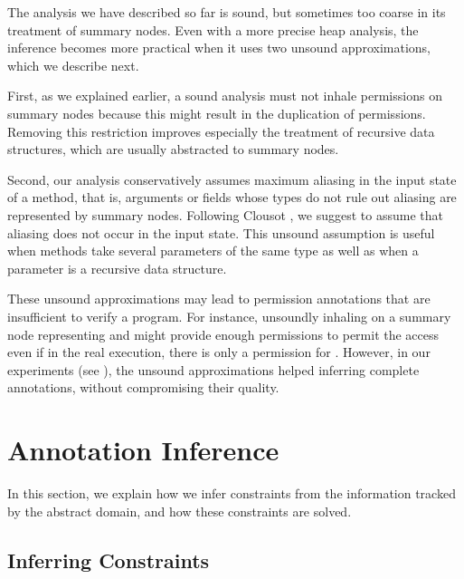 \documentclass{llncs}
\begin{document}
The analysis we have described so far is sound, but sometimes too
coarse in its treatment of summary nodes. Even with a more precise
heap analysis, the inference  becomes more practical when it uses
two unsound approximations, which we describe next.

First, as we explained earlier, a sound analysis must not inhale
permissions on summary nodes because this might result in the
duplication of permissions. Removing this restriction improves
especially the treatment of recursive data structures, which 
are usually abstracted to summary nodes.

Second, our analysis conservatively assumes maximum aliasing in the
input state of a method, that is, arguments or fields whose types do
not rule out aliasing are represented by summary nodes. Following
Clousot \cite{LF10}, we suggest to assume that aliasing does not occur
in the input state. This unsound assumption is useful when methods
take several parameters of the same type as well as when a parameter
is a recursive data structure.

These unsound approximations may lead to permission annotations that
are insufficient to verify a program. For instance, unsoundly inhaling
on a summary node representing  and 
 might provide enough permissions to permit the access 
even if in the real execution, there is only a permission for .
However, in our experiments (see ), 
the unsound approximations helped inferring complete
annotations, without compromising their quality.


\goup
\section{Annotation Inference}
\goup
\label{sect:inference}

In this section, we explain how we infer constraints from the
information tracked by the abstract domain, and how these constraints
are solved.

\goup
\subsection{Inferring Constraints}
\goup
\end{document}
